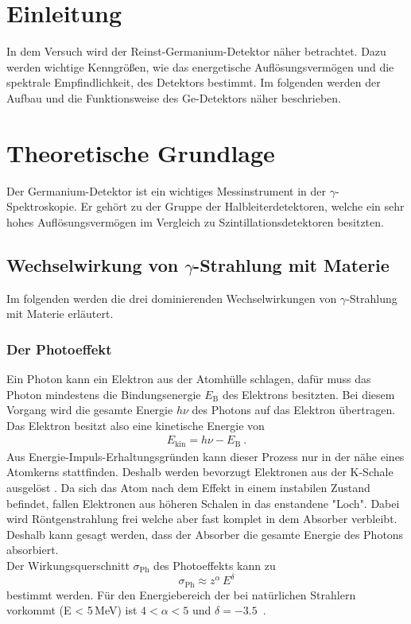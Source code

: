 \section{Einleitung}
In dem Versuch wird der Reinst-Germanium-Detektor näher betrachtet. Dazu werden wichtige Kenngrößen, wie das energetische Auflösungsvermögen und die spektrale Empfindlichkeit, des Detektors bestimmt. Im folgenden werden der Aufbau und die Funktionsweise des Ge-Detektors näher beschrieben.

\section{Theoretische Grundlage}
\label{sec:Theorie}
Der Germanium-Detektor ist ein wichtiges Messinstrument in der $\gamma$-Spektroskopie. Er gehört zu der Gruppe der Halbleiterdetektoren, welche ein sehr hohes Auflösungsvermögen im Vergleich zu Szintillationsdetektoren besitzten.

\subsection{Wechselwirkung von \texorpdfstring{$\gamma$}{}-Strahlung mit Materie}
Im folgenden werden die drei dominierenden Wechselwirkungen von $\gamma$-Strahlung mit Materie erläutert.

\subsubsection{Der Photoeffekt}
Ein Photon kann ein Elektron aus der Atomhülle schlagen, dafür muss das Photon mindestens die Bindungsenergie $E_\text{B}$ des Elektrons besitzten. Bei diesem Vorgang wird die gesamte Energie $h\nu$ des Photons auf das Elektron übertragen. Das Elektron besitzt also eine kinetische Energie von
\begin{align}
	E_\text{kin} = h\nu - E_\text{B} \ .
\end{align}
Aus Energie-Impuls-Erhaltungsgründen kann dieser Prozess nur in der nähe eines Atomkerns stattfinden. Deshalb werden bevorzugt Elektronen aus der K-Schale ausgelöst \cite{V18}. Da sich das Atom nach dem Effekt in einem instabilen Zustand befindet, fallen Elektronen aus höheren Schalen in das enstandene "Loch". Dabei wird Röntgenstrahlung frei welche aber fast komplet in dem Absorber verbleibt. Deshalb kann gesagt werden, dass der Absorber die gesamte Energie des Photons absorbiert. \\
Der Wirkungsquerschnitt $\sigma_\text{Ph}$ des Photoeffekts kann zu
\begin{equation}
	\sigma_\text{Ph} \approx z^{\alpha}\,E^{\delta}
\end{equation}
bestimmt werden. Für den Energiebereich der bei natürlichen Strahlern vorkommt (E < 5\,MeV) ist $4 < \alpha < 5$ und $\delta = -3.5$\ .


